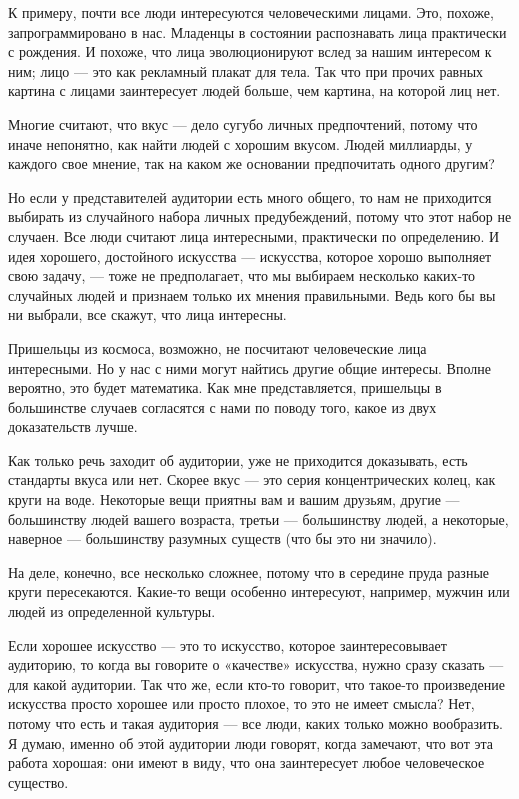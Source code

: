 \documentclass[ebook,12pt,oneside,openany]{memoir}
\begin{document}
К примеру, почти все люди интересуются человеческими лицами. Это,
похоже, запрограммировано в нас. Младенцы в состоянии распознавать
лица практически с рождения. И похоже, что лица эволюционируют вслед
за нашим интересом к ним; лицо — это как рекламный плакат для тела.
Так что при прочих равных картина с лицами заинтересует людей больше,
чем картина, на которой лиц нет. \newline

Многие считают, что вкус — дело сугубо личных предпочтений, потому что
иначе непонятно, как найти людей с хорошим вкусом. Людей миллиарды, у
каждого свое мнение, так на каком же основании предпочитать одного
другим? \newline

Но если у представителей аудитории есть много общего, то нам не
приходится выбирать из случайного набора личных предубеждений, потому
что этот набор не случаен. Все люди считают лица интересными,
практически по определению. И идея хорошего, достойного искусства —
искусства, которое хорошо выполняет свою задачу, — тоже не
предполагает, что мы выбираем несколько каких-то случайных людей и
признаем только их мнения правильными. Ведь кого бы вы ни выбрали, все
скажут, что лица интересны. \newline

Пришельцы из космоса, возможно, не посчитают человеческие лица
интересными. Но у нас с ними могут найтись другие общие интересы.
Вполне вероятно, это будет математика. Как мне представляется,
пришельцы в большинстве случаев согласятся с нами по поводу того,
какое из двух доказательств лучше. \newline

Как только речь заходит об аудитории, уже не приходится доказывать,
есть стандарты вкуса или нет. Скорее вкус — это серия концентрических
колец, как круги на воде. Некоторые вещи приятны вам и вашим друзьям,
другие — большинству людей вашего возраста, третьи — большинству
людей, а некоторые, наверное — большинству разумных существ (что бы
это ни значило). \newline

На деле, конечно, все несколько сложнее, потому что в середине пруда
разные круги пересекаются. Какие-то вещи особенно интересуют,
например, мужчин или людей из определенной культуры. \newline

Если хорошее искусство — это то искусство, которое заинтересовывает
аудиторию, то когда вы говорите о «качестве» искусства, нужно сразу
сказать — для какой аудитории. Так что же, если кто-то говорит, что
такое-то произведение искусства просто хорошее или просто плохое, то
это не имеет смысла? Нет, потому что есть и такая аудитория — все
люди, каких только можно вообразить. Я думаю, именно об этой аудитории
люди говорят, когда замечают, что вот эта работа хорошая: они имеют в
виду, что она заинтересует любое человеческое существо. \newline
\end{document}
